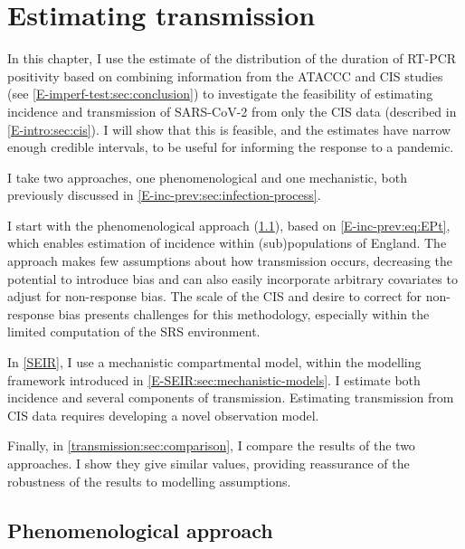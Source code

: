 \documentclass[thesis.tex]{subfiles}
\begin{document}
\ifSubfilesClassLoaded{
    \setcounter{chapter}{6}
}

\chapter{Estimating transmission} \label{transmission}

In this chapter, I use the estimate of the distribution of the duration of RT-PCR positivity based on combining information from the ATACCC and CIS studies (see \cref{E-imperf-test:sec:conclusion}) to investigate the feasibility of estimating incidence and transmission of SARS-CoV-2 from only the CIS data (described in \cref{E-intro:sec:cis}).
I will show that this is feasible, and the estimates have narrow enough credible intervals, to be useful for informing the response to a pandemic.

I take two approaches, one phenomenological and one mechanistic, both previously discussed in \cref{E-inc-prev:sec:infection-process}.

I start with the phenomenological approach (\cref{backcalc}), based on \cref{E-inc-prev:eq:EPt}, which enables estimation of incidence within (sub)populations of England.
The approach makes few assumptions about how transmission occurs, decreasing the potential to introduce bias and can also easily incorporate arbitrary covariates to adjust for non-response bias.
The scale of the CIS and desire to correct for non-response bias presents challenges for this methodology, especially within the limited computation of the SRS environment.

In \cref{SEIR}, I use a mechanistic compartmental model, within the modelling framework introduced in \cref{E-SEIR:sec:mechanistic-models}.
I estimate both incidence and several components of transmission.
Estimating transmission from CIS data requires developing a novel observation model.

Finally, in \cref{transmission:sec:comparison}, I compare the results of the two approaches.
I show they give similar values, providing reassurance of the robustness of the results to modelling assumptions.

\section{Phenomenological approach} \label{backcalc}
\end{document}
